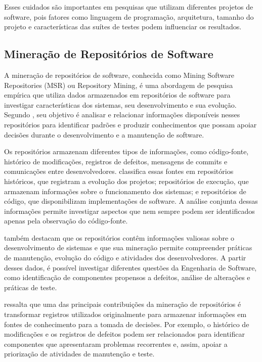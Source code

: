 Esses cuidados são importantes em pesquisas que utilizam diferentes projetos de software, pois fatores como linguagem de programação, arquitetura, tamanho do projeto e características das suítes de testes podem influenciar os resultados.

\subsection{Mineração de Repositórios de Software}

A mineração de repositórios de software, conhecida como Mining Software Repositories (MSR) ou Repository Mining, é uma abordagem de pesquisa empírica que utiliza dados armazenados em repositórios de software para investigar características dos sistemas, seu desenvolvimento e sua evolução. Segundo , seu objetivo é analisar e relacionar informações disponíveis nesses repositórios para identificar padrões e produzir conhecimentos que possam apoiar decisões durante o desenvolvimento e a manutenção de software.

Os repositórios armazenam diferentes tipos de informações, como código-fonte, histórico de modificações, registros de defeitos, mensagens de commits e comunicações entre desenvolvedores.  classifica essas fontes em repositórios históricos, que registram a evolução dos projetos; repositórios de execução, que armazenam informações sobre o funcionamento dos sistemas; e repositórios de código, que disponibilizam implementações de software. A análise conjunta dessas informações permite investigar aspectos que nem sempre podem ser identificados apenas pela observação do código-fonte.

 também destacam que os repositórios contêm informações valiosas sobre o desenvolvimento de sistemas e que sua mineração permite compreender práticas de manutenção, evolução do código e atividades dos desenvolvedores. A partir desses dados, é possível investigar diferentes questões da Engenharia de Software, como identificação de componentes propensos a defeitos, análise de alterações e práticas de teste.

 ressalta que uma das principais contribuições da mineração de repositórios é transformar registros utilizados originalmente para armazenar informações em fontes de conhecimento para a tomada de decisões. Por exemplo, o histórico de modificações e os registros de defeitos podem ser relacionados para identificar componentes que apresentaram problemas recorrentes e, assim, apoiar a priorização de atividades de manutenção e teste.

